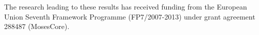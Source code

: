\documentclass{pbml}
\begin{document}
The research leading to these results has received funding from the European Union Seventh Framework Programme (FP7/2007-2013) under grant agreement 288487 (MosesCore).




\correspondingaddress
\end{document}
